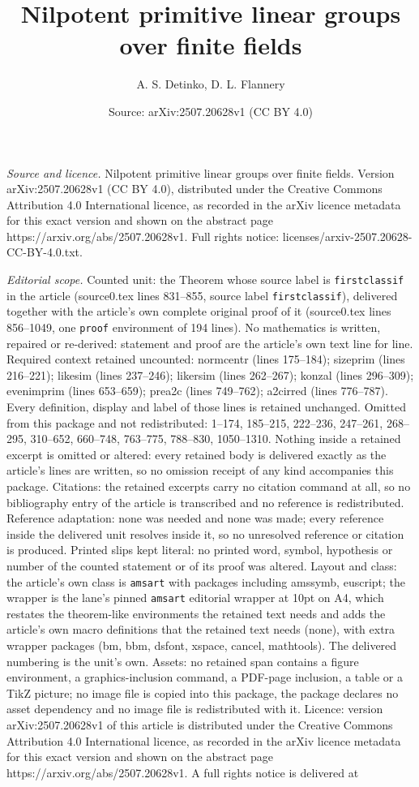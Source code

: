 \documentclass[10pt,a4paper]{amsart}
\title[Nilpotent primitive linear groups over finite fields]{Nilpotent primitive linear groups over finite fields}
\author{A. S. Detinko, D. L. Flannery}
\date{Source: arXiv:2507.20628v1 (CC BY 4.0)}
\begin{document}
\maketitle

\noindent\emph{Source and licence.} Nilpotent primitive linear groups over finite fields. Version arXiv:2507.20628v1 (CC BY 4.0), distributed under the Creative Commons Attribution 4.0 International licence, as recorded in the arXiv licence metadata for this exact version and shown on the abstract page https://arxiv.org/abs/2507.20628v1. Full rights notice: licenses/arxiv-2507.20628-CC-BY-4.0.txt.\par\smallskip

\noindent\textit{Editorial scope.} Counted unit: the Theorem whose source label is \texttt{firstclassif} in the article (source0.tex lines 831--855, source label \texttt{firstclassif}), delivered together with the article's own complete original proof of it (source0.tex lines 856--1049, one \texttt{proof} environment of 194 lines). No mathematics is written, repaired or re-derived: statement and proof are the article's own text line for line. Required context retained uncounted: normcentr (lines 175--184); sizeprim (lines 216--221); likesim (lines 237--246); likersim (lines 262--267); konzal (lines 296--309); evenimprim (lines 653--659); prea2c (lines 749--762); a2cirred (lines 776--787). Every definition, display and label of those lines is retained unchanged. Omitted from this package and not redistributed: 1--174, 185--215, 222--236, 247--261, 268--295, 310--652, 660--748, 763--775, 788--830, 1050--1310. Nothing inside a retained excerpt is omitted or altered: every retained body is delivered exactly as the article's lines are written, so no omission receipt of any kind accompanies this package. Citations: the retained excerpts carry no citation command at all, so no bibliography entry of the article is transcribed and no reference is redistributed. Reference adaptation: none was needed and none was made; every reference inside the delivered unit resolves inside it, so no unresolved reference or citation is produced. Printed slips kept literal: no printed word, symbol, hypothesis or number of the counted statement or of its proof was altered. Layout and class: the article's own class is \texttt{amsart} with packages including amssymb, euscript; the wrapper is the lane's pinned \texttt{amsart} editorial wrapper at 10pt on A4, which restates the theorem-like environments the retained text needs and adds the article's own macro definitions that the retained text needs (none), with extra wrapper packages (bm, bbm, dsfont, xspace, cancel, mathtools). The delivered numbering is the unit's own. Assets: no retained span contains a figure environment, a graphics-inclusion command, a PDF-page inclusion, a table or a TikZ picture; no image file is copied into this package, the package declares no asset dependency and no image file is redistributed with it. Licence: version arXiv:2507.20628v1 of this article is distributed under the Creative Commons Attribution 4.0 International licence, as recorded in the arXiv licence metadata for this exact version and shown on the abstract page https://arxiv.org/abs/2507.20628v1. A full rights notice is delivered at 
\end{document}
